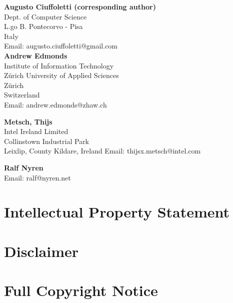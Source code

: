 \documentclass[10pt,a4paper]{article}
\begin{document}
\textbf{Augusto Ciuffoletti (corresponding author)} \\
Dept. of Computer Science \\
L.go B. Pontecorvo - Pisa\\
Italy \\
Email: augusto.ciuffoletti@gmail.com \\

\textbf{Andrew Edmonds}\\
Institute of Information Technology \\
Zürich University of Applied Sciences \\
Zürich \\
Switzerland \\
Email: andrew.edmonds@zhaw.ch

\textbf{Metsch, Thijs} \\
Intel Ireland Limited \\
Collinstown Industrial Park \\
Leixlip, County Kildare, Ireland
Email: thijsx.metsch@intel.com

\textbf{Ralf Nyren} \\
Email: ralf@nyren.net 


\section{Intellectual Property Statement}


\section{Disclaimer}


\section{Full Copyright Notice}








\end{document}
